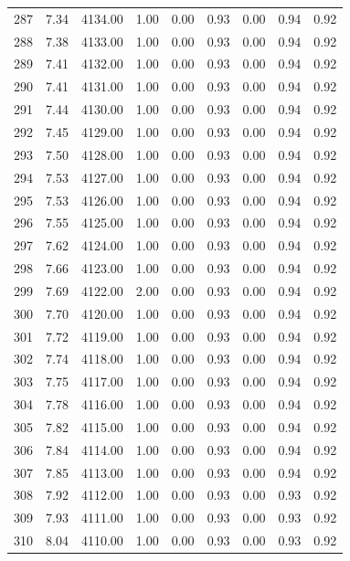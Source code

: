 \documentclass{article}\usepackage[]{graphicx}\usepackage[]{color}
\begin{document}
\begin{longtable}{rrrrrrrrr}
  287 & 7.34 & 4134.00 & 1.00 & 0.00 & 0.93 & 0.00 & 0.94 & 0.92 \\ 
  288 & 7.38 & 4133.00 & 1.00 & 0.00 & 0.93 & 0.00 & 0.94 & 0.92 \\ 
  289 & 7.41 & 4132.00 & 1.00 & 0.00 & 0.93 & 0.00 & 0.94 & 0.92 \\ 
  290 & 7.41 & 4131.00 & 1.00 & 0.00 & 0.93 & 0.00 & 0.94 & 0.92 \\ 
  291 & 7.44 & 4130.00 & 1.00 & 0.00 & 0.93 & 0.00 & 0.94 & 0.92 \\ 
  292 & 7.45 & 4129.00 & 1.00 & 0.00 & 0.93 & 0.00 & 0.94 & 0.92 \\ 
  293 & 7.50 & 4128.00 & 1.00 & 0.00 & 0.93 & 0.00 & 0.94 & 0.92 \\ 
  294 & 7.53 & 4127.00 & 1.00 & 0.00 & 0.93 & 0.00 & 0.94 & 0.92 \\ 
  295 & 7.53 & 4126.00 & 1.00 & 0.00 & 0.93 & 0.00 & 0.94 & 0.92 \\ 
  296 & 7.55 & 4125.00 & 1.00 & 0.00 & 0.93 & 0.00 & 0.94 & 0.92 \\ 
  297 & 7.62 & 4124.00 & 1.00 & 0.00 & 0.93 & 0.00 & 0.94 & 0.92 \\ 
  298 & 7.66 & 4123.00 & 1.00 & 0.00 & 0.93 & 0.00 & 0.94 & 0.92 \\ 
  299 & 7.69 & 4122.00 & 2.00 & 0.00 & 0.93 & 0.00 & 0.94 & 0.92 \\ 
  300 & 7.70 & 4120.00 & 1.00 & 0.00 & 0.93 & 0.00 & 0.94 & 0.92 \\ 
  301 & 7.72 & 4119.00 & 1.00 & 0.00 & 0.93 & 0.00 & 0.94 & 0.92 \\ 
  302 & 7.74 & 4118.00 & 1.00 & 0.00 & 0.93 & 0.00 & 0.94 & 0.92 \\ 
  303 & 7.75 & 4117.00 & 1.00 & 0.00 & 0.93 & 0.00 & 0.94 & 0.92 \\ 
  304 & 7.78 & 4116.00 & 1.00 & 0.00 & 0.93 & 0.00 & 0.94 & 0.92 \\ 
  305 & 7.82 & 4115.00 & 1.00 & 0.00 & 0.93 & 0.00 & 0.94 & 0.92 \\ 
  306 & 7.84 & 4114.00 & 1.00 & 0.00 & 0.93 & 0.00 & 0.94 & 0.92 \\ 
  307 & 7.85 & 4113.00 & 1.00 & 0.00 & 0.93 & 0.00 & 0.94 & 0.92 \\ 
  308 & 7.92 & 4112.00 & 1.00 & 0.00 & 0.93 & 0.00 & 0.93 & 0.92 \\ 
  309 & 7.93 & 4111.00 & 1.00 & 0.00 & 0.93 & 0.00 & 0.93 & 0.92 \\ 
  310 & 8.04 & 4110.00 & 1.00 & 0.00 & 0.93 & 0.00 & 0.93 & 0.92 \\ 

\end{longtable}
\end{document}
